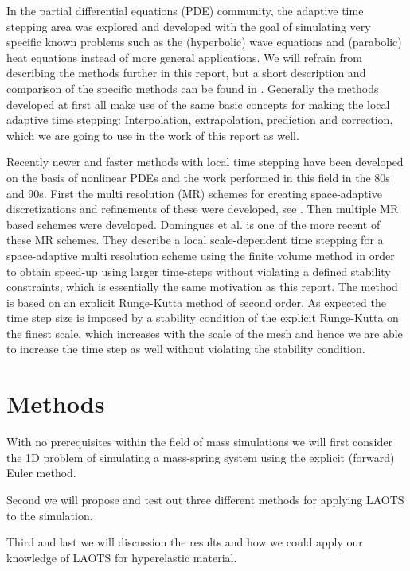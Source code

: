 \documentclass[twoside]{article}
\begin{document}
\begin{multicols}{2}
In the partial differential equations (PDE) community, the adaptive time
stepping area was explored and developed with the goal of simulating
very specific known problems such as the (hyperbolic) wave equations
and (parabolic) heat equations instead of more general applications. We
will refrain from describing the methods further in this report, but a
short description and comparison of the specific methods can be found in
\cite{Gander:2013}. Generally the methods developed at first all make use
of the same basic concepts for making the local adaptive time stepping:
Interpolation, extrapolation, prediction and correction, which we are going to
use in the work of this report as well.

Recently newer and faster methods with local time stepping have been developed
on the basis of nonlinear PDEs and the work performed in this field in
the 80s and 90s. First the multi resolution (MR) schemes for creating
space-adaptive discretizations and refinements of these were developed, see
\cite{Berger:1984}. Then multiple MR based schemes were developed. Domingues
et al. \cite{Domingues:2008} is one of the more recent of these MR schemes.
They describe a local scale-dependent time stepping for a space-adaptive multi
resolution scheme using the finite volume method in order to obtain speed-up
using larger time-steps without violating a defined stability constraints,
which is essentially the same motivation as this report. The method is based
on an explicit Runge-Kutta method of second order. As expected the time step
size is imposed by a stability condition of the explicit Runge-Kutta on the
finest scale, which increases with the scale of the mesh and hence we are able
to increase the time step as well without violating the stability condition.



\section{Methods}

With no prerequisites within the field of mass simulations we will first
consider the 1D problem of simulating a mass-spring system using the explicit
(forward) Euler method.

Second we will propose and test out three different methods for applying LAOTS
to the simulation.

Third and last we will discussion the results and how we
could apply our knowledge of LAOTS for hyperelastic material.


\end{multicols}
\end{document}
